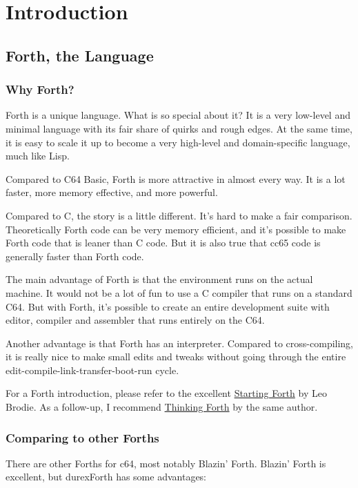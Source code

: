 \chapter{Introduction}

\section{Forth, the Language}

\subsection{Why Forth?}

Forth is a unique language. What is so special about it? It is a very low-level and minimal language with its fair share of quirks and rough edges. At the same time, it is easy to scale it up to become a very high-level and domain-specific language, much like Lisp. 

Compared to C64 Basic, Forth is more attractive in almost every way. It is a lot faster, more memory effective, and more powerful.

Compared to C, the story is a little different. It's hard to make a fair comparison. Theoretically Forth code can be very memory efficient, and it's possible to make Forth code that is leaner than C code. But it is also true that cc65 code is generally faster than Forth code.

The main advantage of Forth is that the environment runs on the actual machine. It would not be a lot of fun to use a C compiler that runs on a standard C64. But with Forth, it's possible to create an entire development suite with editor, compiler and assembler that runs entirely on the C64.

Another advantage is that Forth has an interpreter. Compared to cross-compiling, it is really nice to make small edits and tweaks without going through the entire edit-compile-link-transfer-boot-run cycle.

For a Forth introduction, please refer to the excellent
\href{http://www.forth.com/starting-forth/}{Starting Forth} by Leo Brodie. As a follow-up, I
recommend \href{http://thinking-forth.sourceforge.net/}{Thinking Forth} by the same author.

\subsection{Comparing to other Forths}

There are other Forths for c64, most notably Blazin' Forth. Blazin' Forth is excellent, but durexForth has some advantages:

